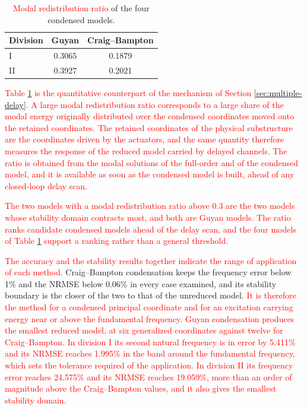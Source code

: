 \documentclass[11pt,a4paper]{article}
\numberwithin{equation}{section}
\newcommand{\rev}[1]{\textcolor{red}{#1}}
\begin{document}
\begin{table}[htbp]
	\centering
	\caption{\rev{Modal redistribution ratio} of the four condensed models.}
	\label{tab:energy}
	\begin{tabular}{lcc}
		\toprule
		Division & Guyan & Craig--Bampton\\
		\midrule
		I  & 0.3065 & 0.1879\\
		II & 0.3927 & 0.2021\\
		\bottomrule
	\end{tabular}
\end{table}

\rev{Table \ref{tab:energy} is the quantitative counterpart of the mechanism of Section \ref{sec:multiple-delay}. A large modal redistribution ratio corresponds to a large share of the modal energy originally distributed over the condensed coordinates moved onto the retained coordinates. The retained coordinates of the physical substructure are the coordinates driven by the actuators, and the same quantity therefore measures the response of the reduced model carried by delayed channels. The ratio is obtained from the modal solutions of the full-order and of the condensed model, and it is available as soon as the condensed model is built, ahead of any closed-loop delay scan.}

\rev{The two models with a modal redistribution ratio above 0.3 are the two models whose stability domain contracts most, and both are Guyan models. The ratio ranks candidate condensed models ahead of the delay scan, and the four models of Table \ref{tab:energy} support a ranking rather than a general threshold.}

\rev{The accuracy and the stability results together indicate the range of application of each method.} Craig--Bampton condensation keeps the frequency error below 1\% and the NRMSE below 0.06\% in every case examined, and its stability boundary is the closer of the two to that of the unreduced model\rev{. It is therefore the method for a condensed principal coordinate and for an excitation carrying energy near or above the fundamental frequency. Guyan condensation produces the smallest reduced model, at six generalized coordinates against twelve for Craig--Bampton. In division I its second natural frequency is in error by 5.411\% and its NRMSE reaches 1.995\% in the band around the fundamental frequency, which sets the tolerance required of the application. In division II its frequency error reaches 24.575\% and its NRMSE reaches 19.059\%, more than an order of magnitude above the Craig--Bampton values, and it also gives the smallest stability domain.}
\end{document}
